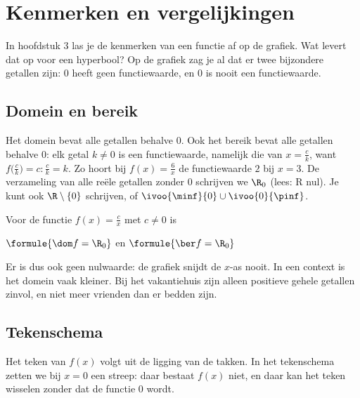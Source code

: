 \begin{oefeningen}
\end{oefeningen}

\section{Kenmerken en vergelijkingen}

In hoofdstuk 3 las je de kenmerken van een functie af op de grafiek. Wat levert dat op voor een hyperbool? Op de grafiek zag je al dat er twee bijzondere getallen zijn: $0$ heeft geen functiewaarde, en $0$ is nooit een functiewaarde.

\subsection{Domein en bereik}

Het domein bevat alle getallen behalve $0$. Ook het bereik bevat alle getallen behalve $0$: elk getal $k \neq 0$ is een functiewaarde, namelijk die van $x = \tfrac ck$, want $f\bigl(\tfrac ck\bigr) = c : \tfrac ck = k$. Zo hoort bij $f(x) = \tfrac6x$ de functiewaarde $2$ bij $x = 3$. De verzameling van alle reële getallen zonder $0$ schrijven we $\R_0$ (lees: R nul). Je kunt ook $\R \setminus \{0\}$ schrijven, of $\ivoo{\minf}{0} \cup \ivoo{0}{\pinf}$.

\begin{theorie}
Voor de functie $f(x) = \tfrac cx$ met $c \neq 0$ is

\vspace{1mm}
\qquad $\formule{\dom f = \R_0}$ \qquad en \qquad $\formule{\ber f = \R_0}$
\end{theorie}

Er is dus ook geen nulwaarde: de grafiek snijdt de $x$-as nooit. In een context is het domein vaak kleiner. Bij het vakantiehuis zijn alleen positieve gehele getallen zinvol, en niet meer vrienden dan er bedden zijn.

\subsection{Tekenschema}

Het teken van $f(x)$ volgt uit de ligging van de takken. In het tekenschema zetten we bij $x = 0$ een streep: daar bestaat $f(x)$ niet, en daar kan het teken wisselen zonder dat de functie $0$ wordt.

